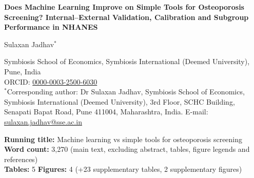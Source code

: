\documentclass[11pt,a4paper]{article}
\begin{document}
\begin{titlepage}
\begin{center}
{\LARGE\bfseries Does Machine Learning Improve on Simple Tools for Osteoporosis Screening? Internal--External Validation, Calibration and Subgroup Performance in NHANES\par}
\vspace{1.5em}
{\large Sulaxan Jadhav$^{*}$\par}
\vspace{1em}
{\small Symbiosis School of Economics, Symbiosis International (Deemed University), Pune, India\\[2pt]
ORCID: \href{https://orcid.org/0000-0003-2500-6030}{0000-0003-2500-6030}\\[2pt]
$^{*}$Corresponding author: Dr Sulaxan Jadhav, Symbiosis School of Economics, Symbiosis International (Deemed University), 3rd Floor, SCHC Building, Senapati Bapat Road, Pune 411004, Maharashtra, India. E-mail: \href{mailto:sulaxan.jadhav@sse.ac.in}{sulaxan.jadhav@sse.ac.in}\par}
\end{center}
\vspace{2em}
\noindent\textbf{Running title:} Machine learning vs simple tools for osteoporosis screening\\[4pt]
\textbf{Word count:} 3,270 (main text, excluding abstract, tables, figure legends and references)\\[2pt]
\textbf{Tables:} 5 \quad \textbf{Figures:} 4 (+23 supplementary tables, 2 supplementary figures)\\[4pt]

\end{titlepage}
\end{document}
